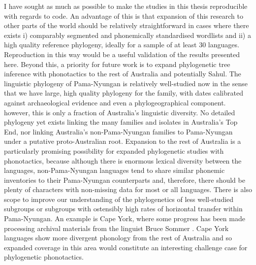 I have sought as much as possible to make the studies in this thesis reproducible with regards to code. An advantage of this is that expansion of this research to other parts of the world should be relatively straightforward in cases where there exists i) comparably segmented and phonemically standardised wordlists and ii) a high quality reference phylogeny, ideally for a sample of at least 30 languages. Reproduction in this way would be a useful validation of the results presented here. Beyond this, a priority for future work is to expand phylogenetic tree inference with phonotactics to the rest of Australia and potentially Sahul. The linguistic phylogeny of Pama-Nyungan is relatively well-studied now in the sense that we have large, high quality phylogeny for the family, with dates calibrated against archaeological evidence and even a phylogeographical component. however, this is only a fraction of Australia's linguistic diversity. No detailed phylogeny yet exists linking the many families and isolates in Australia's Top End, nor linking Australia's non-Pama-Nyungan families to Pama-Nyungan under a putative proto-Australian root. Expansion to the rest of Australia is a particularly promising possibility for expanded phylogenetic studies with phonotactics, because although there is enormous lexical diversity between the languages, non-Pama-Nyungan languages tend to share similar phonemic inventories to their Pama-Nyungan counterparts and, therefore, there should be plenty of characters with non-missing data for most or all languages. There is also scope to improve our understanding of the phylogenetics of less well-studied subgroups or subgroups with ostensibly high rates of horizontal transfer within Pama-Nyungan. An example is Cape York, where some progress has been made processing archival materials from the linguist Bruce Sommer \autocite{hollis_cape_2016}. Cape York languages show more divergent phonology from the rest of Australia and so expanded coverage in this area would constitute an interesting challenge case for phylogenetic phonotactics.

